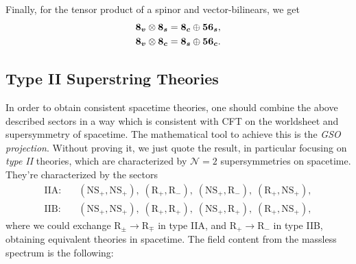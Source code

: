 Finally, for the tensor product of a spinor and vector-bilinears, we get
\begin{subequations}
\begin{align}
    \boldsymbol{8_v} \otimes \boldsymbol{8_s} = \boldsymbol{8_c} \oplus \boldsymbol{56_s} ,\\
    \boldsymbol{8_v} \otimes \boldsymbol{8_c} = \boldsymbol{8_s} \oplus \boldsymbol{56_c} .
\end{align}
\end{subequations}
 
\subsection{Type II Superstring Theories}
In order to obtain consistent spacetime theories, one should combine the above described sectors in a way which is consistent with CFT on the worldsheet and supersymmetry of spacetime. The mathematical tool to achieve this is the \emph{GSO projection}. Without proving it, we just quote the result, in particular focusing on \emph{type II} theories, which are characterized by $\mathcal{N} = 2$ supersymmetries on spacetime. They're characterized by the sectors
\begin{equation}
\begin{aligned}
   \text{IIA}: \quad &(\text{NS}_+, \text{NS}_+),\; (\text{R}_+, \text{R}_-), \;(\text{NS}_+,\text{R}_-),\; (\text{R}_+, \text{NS}_+) , \\
   \text{IIB}: \quad &(\text{NS}_+, \text{NS}_+), \;(\text{R}_+, \text{R}_+), \;(\text{NS}_+,\text{R}_+), \;(\text{R}_+, \text{NS}_+),
\end{aligned}
\end{equation}
where we could exchange $\text{R}_\pm \to \text{R}_\mp$ in type IIA, and $\text{R}_+\to \text{R}_-$ in type IIB, obtaining equivalent theories in spacetime. The field content from the massless spectrum is the following:
